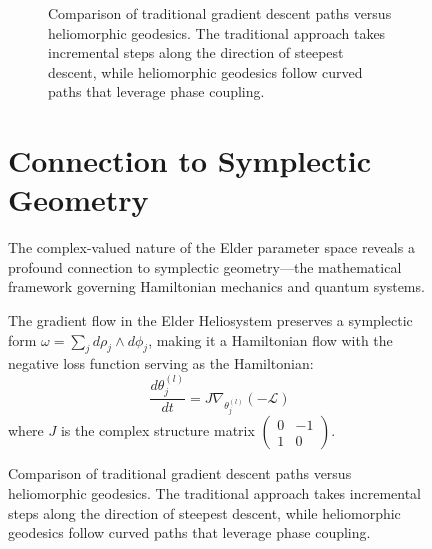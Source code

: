 \begin{figure}[ht]
\begin{figure}[ht]
\caption{Comparison of traditional gradient descent paths versus heliomorphic geodesics. The traditional approach takes incremental steps along the direction of steepest descent, while heliomorphic geodesics follow curved paths that leverage phase coupling.}
\label{fig:geodesics}
\end{figure}

\section{Connection to Symplectic Geometry}

The complex-valued nature of the Elder parameter space reveals a profound connection to symplectic geometry—the mathematical framework governing Hamiltonian mechanics and quantum systems.

\begin{theorem}
The gradient flow in the Elder Heliosystem preserves a symplectic form $\omega = \sum_j d\rho_j \wedge d\phi_j$, making it a Hamiltonian flow with the negative loss function serving as the Hamiltonian:
\begin{equation}
\frac{d\theta^{(l)}_j}{dt} = J \nabla_{\theta^{(l)}_j} (-\mathcal{L})
\end{equation}
where $J$ is the complex structure matrix $\begin{pmatrix} 0 & -1 \\ 1 & 0 \end{pmatrix}$.
\end{theorem}


\end{figure}
